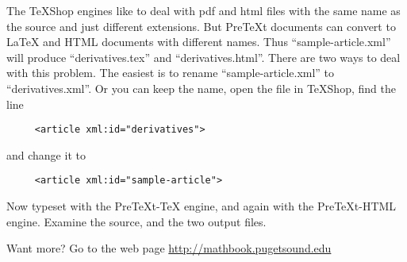 \documentclass[11pt, oneside]{article}   	%
\begin{document}
The TeXShop engines like to deal with pdf and html files with the same name as the source and just different extensions. But PreTeXt documents can convert to  LaTeX and HTML documents with different names. Thus ``sample-article.xml'' will produce ``derivatives.tex'' and ``derivatives.html''. There are two ways to deal with this problem. The easiest is to rename
``sample-article.xml'' to ``derivatives.xml''. Or you can keep the name, open the file in TeXShop, find the line
\begin{verbatim}
     <article xml:id="derivatives">
\end{verbatim}
and change it to
\begin{verbatim}
     <article xml:id="sample-article">
\end{verbatim}

Now typeset with the PreTeXt-TeX engine, and again with the PreTeXt-HTML engine. Examine the source, and the two output files.

Want more? Go to the web page \url{http://mathbook.pugetsound.edu}

	
\end{document}
